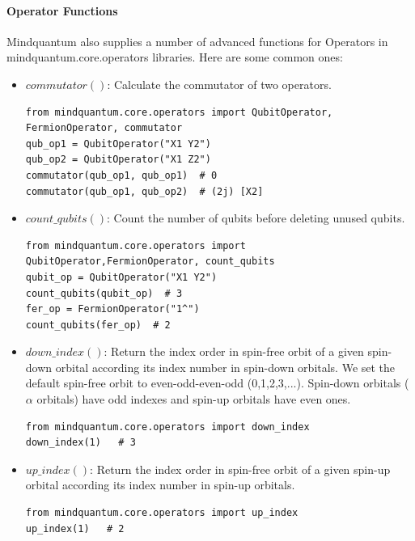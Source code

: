 \paragraph{Operator Functions}
Mindquantum also supplies a number of advanced functions for Operators in mindquantum.core.operators libraries. Here are some common ones:
\begin{itemize}
    \item $commutator()$: Calculate the commutator of two operators.
          \begin{lstlisting}
from mindquantum.core.operators import QubitOperator, FermionOperator, commutator
qub_op1 = QubitOperator("X1 Y2")
qub_op2 = QubitOperator("X1 Z2")
commutator(qub_op1, qub_op1)  # 0
commutator(qub_op1, qub_op2)  # (2j) [X2]
    \end{lstlisting}
    \item $count\_qubits()$: Count the number of qubits before deleting unused qubits.
          \begin{lstlisting}
from mindquantum.core.operators import QubitOperator,FermionOperator, count_qubits
qubit_op = QubitOperator("X1 Y2")
count_qubits(qubit_op)  # 3
fer_op = FermionOperator("1^")
count_qubits(fer_op)  # 2
    \end{lstlisting}
    \item $down\_index()$: Return the index order in spin-free orbit of a given spin-down orbital according its index number in spin-down orbitals. We set the default spin-free orbit to even-odd-even-odd (0,1,2,3,...). Spin-down orbitals ($\alpha$ orbitals) have odd indexes and spin-up orbitals have even ones.
          \begin{lstlisting}
from mindquantum.core.operators import down_index
down_index(1)   # 3
    \end{lstlisting}
    \item $up\_index()$: Return the index order in spin-free orbit of a given spin-up orbital according its index number in spin-up orbitals.
          \begin{lstlisting}
from mindquantum.core.operators import up_index
up_index(1)   # 2
    \end{lstlisting}
\end{itemize}
